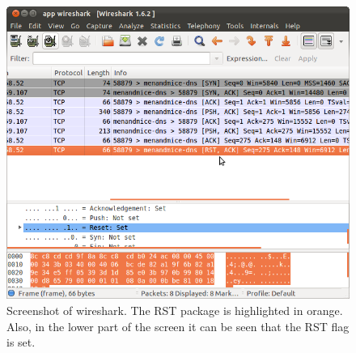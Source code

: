 \begin{center}
\begin{figure}[h]
	\centering
	\mbox{\includegraphics[width=1\textwidth]{Images/tcp_rst.png}}
	\caption{Screenshot of wireshark. The RST package is highlighted in orange. Also, in the lower part of the screen it can be seen that the RST flag is set.}
	\label{fig:TCP_RST}
\end{figure}
\end{center}

